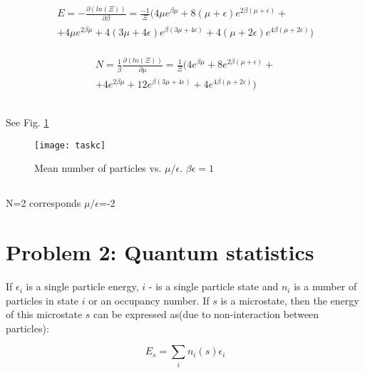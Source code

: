\documentclass[10pt]{article}
\begin{document}
\begin{align}
\begin{split}
E = -\frac{\partial(ln(\Xi))}{\partial \beta} = \frac{-1}{\Xi} (4\mu e^{\beta \mu} + 8( \mu + \epsilon)e^{2\beta( \mu + \epsilon)} + \\
+ 4\mu e^{2\beta \mu} + 4(3\mu + 4\epsilon)e^{\beta(3\mu + 4\epsilon)} + 4( \mu + 2\epsilon)e^{4\beta( \mu + 2\epsilon)})
\label{eg:taskb:energy}
\end{split}
\end{align}


\begin{align}
\begin{split}
N = \frac{1}{\beta}\frac{\partial(ln(\Xi))}{\partial \mu} = \frac{1}{\Xi} (4e^{\beta \mu} + 8e^{2\beta( \mu + \epsilon)} + \\
+ 4e^{2\beta \mu} + 12e^{\beta(3\mu + 4\epsilon)} + 4e^{4\beta( \mu + 2\epsilon)})
\label{eg:taskb:numpart}
\end{split}
\end{align}


\subsection{}
See Fig. \ref{fig:taskc}

\begin{figure}
  \begin{center}
    \texttt{[image: taskc]}
    \caption {Mean number of particles vs. $\mu/\epsilon$. $\beta \epsilon=1$}
    \label{fig:taskc}
  \end{center}
\end{figure}


\subsection{}
N=2 corresponds $\mu/\epsilon$=-2
\section{Problem 2: Quantum statistics}

If $\epsilon_i$ is a single particle energy, $i$ - is a single particle state and $n_i$ is a number of particles in state $i$ or an occupancy number. If $s$ is a microstate, then the energy of this microstate $s$ can be expressed as(due to non-interaction between particles):

\begin{equation}
E_s = \sum_i n_i(s)\epsilon_i
\end{equation}
\end{document}
